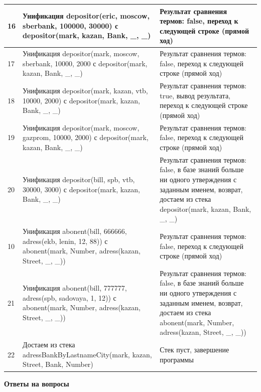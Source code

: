 \documentclass[a4paper,14pt]{extreport} %
\begin{document}
\begin{longtable}{|p{1.1cm}|p{8.5cm}|p{7cm}|}
	16 & Унификация depositor(eric, moscow, sberbank, 100000, 30000) с depositor(mark, kazan, Bank, \_, \_) & Результат сравнения термов: false, переход к следующей строке (прямой ход) \\ \hline
	17 & Унификация depositor(mark, moscow, sberbank, 10000, 2000 с depositor(mark, kazan, Bank, \_, \_) & Результат сравнения термов: false, переход к следующей строке (прямой ход) \\ \hline
	18 & Унификация depositor(mark, kazan, vtb, 10000, 2000) с depositor(mark, kazan, Bank, \_, \_) & Результат сравнения термов:  true, вывод результата, переход к следующей строке (прямой ход)\\ \hline
	19 & Унификация depositor(mark, moscow, gazprom, 10000, 2000) с depositor(mark, kazan, Bank, \_, \_) & Результат сравнения термов: false, переход к следующей строке (прямой ход) \\ \hline
	20 & Унификация depositor(bill, spb, vtb, 30000, 3000) с depositor(mark, kazan, Bank, \_, \_) & Результат сравнения термов: false, в базе знаний больше ни одного утверждения с заданным именем, возврат, достаем из стека depositor(mark, kazan, Bank, \_, \_) \\ \hline

	10 & Унификация abonent(bill, 666666, adress(ekb, lenin, 12, 88)) с abonent(mark, Number, adress(kazan, Street, \_, \_))& Результат сравнения термов: false, переход к следующей строке (прямой ход)\\ \hline
	21 & Унификация abonent(bill, 777777, adress(spb, sadovaya, 1, 12)) с abonent(mark, Number, adress(kazan, Street, \_, \_)) & Результат сравнения термов: false, в базе знаний больше ни одного утверждения с заданным именем, возврат, достаем из стека abonent(mark, Number, adress(kazan, Street, \_, \_)) \\ \hline
	22 & Достаем из стека adressBankByLastnameCity(mark, kazan, Street, Bank, Number) & Стек пуст, завершение программы \\ \hline
\end{longtable}

\hfill

\textbf{Ответы на вопросы}
\end{document}
